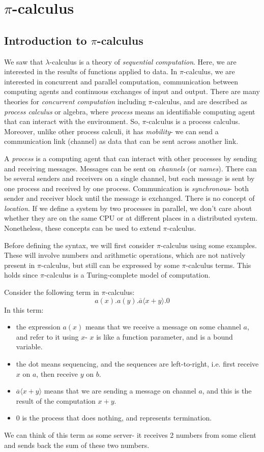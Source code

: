 \documentclass[a4paper, openany]{memoir}
\theoremstyle{definition}
\begin{document}
    \chapter{$\pi$-calculus}
    \section{Introduction to $\pi$-calculus}
    We saw that $\lambda$-calculus is a theory of \emph{sequential computation}. Here, we are interested in the results of functions applied to data. In $\pi$-calculus, we are interested in concurrent and parallel computation, communication between computing agents and continuous exchanges of input and output. There are many theories for \emph{concurrent computation} including $\pi$-calculus, and are described as \emph{process calculus} or algebra, where \emph{process} means an identifiable computing agent that can interact with the environment. So, $\pi$-calculus is a process calculus. Moreover, unlike other process calculi, it has \emph{mobility}- we can send a communication link (channel) as data that can be sent across another link.

    A \emph{process} is a computing agent that can interact with other processes by sending and receiving messages. Messages can be sent on \emph{channels} (or \emph{names}). There can be several senders and receivers on a single channel, but each message is sent by one process and received by one process. Communication is \emph{synchronous}- both sender and receiver block until the message is exchanged. There is no concept of \emph{location}. If we define a system by two processes in parallel, we don't care about whether they are on the same CPU or at different places in a distributed system. Nonetheless, these concepts can be used to extend $\pi$-calculus.

    Before defining the syntax, we will first consider $\pi$-calculus using some examples. These will involve numbers and arithmetic operations, which are not natively present in $\pi$-calculus, but still can be expressed by some $\pi$-calculus terms. This holds since $\pi$-calculus is a Turing-complete model of computation. 

    Consider the following term in $\pi$-calculus:
    \[a(x).a(y).\overline{a}\langle x + y \rangle.0\]
    In this term:
    \begin{itemize}
        \item the expression $a(x)$ means that we receive a message on some channel $a$, and refer to it using $x$- $x$ is like a function parameter, and is a bound variable.
        \item the dot means sequencing, and the sequences are left-to-right, i.e. first receive $x$ on $a$, then receive $y$ on $b$.
        \item $\overline{a} \langle x + y \rangle$ means that we are sending a message on channel $a$, and this is the result of the computation $x + y$.
        \item $0$ is the process that does nothing, and represents termination.
    \end{itemize}
    We can think of this term as some server- it receives 2 numbers from some client and sends back the sum of these two numbers.
\end{document}
